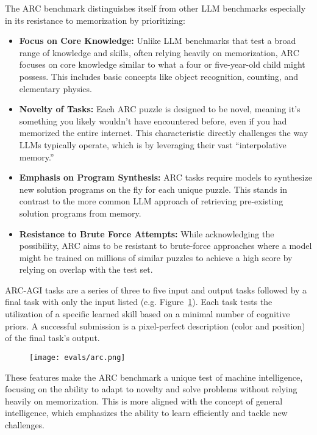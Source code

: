 The ARC benchmark distinguishes itself from other LLM benchmarks especially in its resistance to memorization by prioritizing:

\begin{itemize}
    \item \textbf{Focus on Core Knowledge:} Unlike LLM benchmarks that test a broad range of knowledge and skills, often relying heavily on memorization, ARC focuses on core knowledge similar to what a four or five-year-old child might possess. This includes basic concepts like object recognition, counting, and elementary physics.

    \item \textbf{Novelty of Tasks:} Each ARC puzzle is designed to be novel, meaning it's something you likely wouldn't have encountered before, even if you had memorized the entire internet. This characteristic directly challenges the way LLMs typically operate, which is by leveraging their vast ``interpolative memory.''

    \item \textbf{Emphasis on Program Synthesis:} ARC tasks require models to synthesize new solution programs on the fly for each unique puzzle. This stands in contrast to the more common LLM approach of retrieving pre-existing solution programs from memory.

    \item \textbf{Resistance to Brute Force Attempts:} While acknowledging the possibility, ARC aims to be resistant to brute-force approaches where a model might be trained on millions of similar puzzles to achieve a high score by relying on overlap with the test set.
\end{itemize}

ARC-AGI tasks are a series of three to five input and output tasks followed by a final task with only the input listed (e.g. Figure~\ref{arc}). Each task tests the utilization of a specific learned skill based on a minimal number of cognitive priors. A successful submission is a pixel-perfect description (color and position) of the final task's output.

\begin{figure}[h]
\centering
\texttt{[image: evals/arc.png]}
\label{arc}
\end{figure}
These features make the ARC benchmark a unique test of machine intelligence, focusing on the ability to adapt to novelty and solve problems without relying heavily on memorization. This is more aligned with the concept of general intelligence, which emphasizes the ability to learn efficiently and tackle new challenges.

